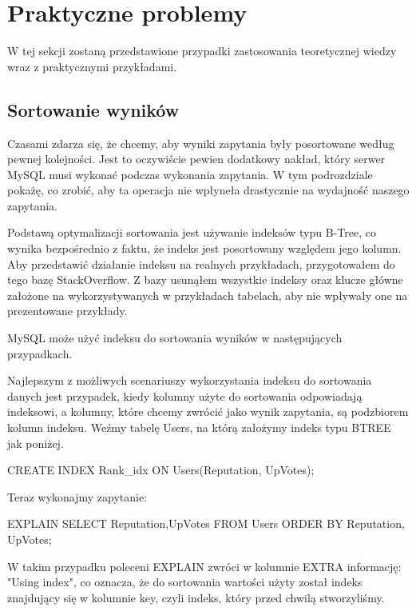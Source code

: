 \section{Praktyczne problemy}
W tej sekcji zostaną przedstawione przypadki zastosowania teoretycznej wiedzy wraz z praktycznymi przykładami.



\subsection{Sortowanie wyników}
Czasami zdarza się, że chcemy, aby wyniki zapytania były posortowane według pewnej kolejności. Jest to oczywiście pewien dodatkowy nakład, który serwer MySQL musi wykonać podczas wykonania zapytania. W tym podrozdziale pokażę, co zrobić, aby ta operacja nie wpłyneła drastycznie na wydajność naszego zapytania.

Podstawą optymalizacji sortowania jest używanie indeksów typu B-Tree, co wynika bezpośrednio z faktu, że indeks jest posortowany względem jego kolumn. Aby przedstawić działanie indeksu na realnych przykładach, przygotowałem do tego bazę StackOverflow. Z bazy usunąłem wszystkie indeksy oraz klucze główne założone na wykorzystywanych w przykładach tabelach, aby nie wpływały one na prezentowane przykłady.

MySQL może użyć indeksu do sortowania wyników w następujących przypadkach.



Najlepszym z możliwych scenariuszy wykorzystania indeksu do sortowania danych jest przypadek, kiedy kolumny użyte do sortowania odpowiadają indeksowi, a kolumny, które chcemy zwrócić jako wynik zapytania, są podzbiorem kolumn indeksu.
Weźmy tabelę Users, na którą założymy indeks typu BTREE jak poniżej.

\begin{spverbatim}
	CREATE INDEX Rank_idx ON Users(Reputation, UpVotes);
\end{spverbatim}
Teraz wykonajmy zapytanie:
\begin{spverbatim}
	EXPLAIN SELECT Reputation,UpVotes FROM Users ORDER BY Reputation, UpVotes;
\end{spverbatim}
W takim przypadku poleceni EXPLAIN zwróci w kolumnie EXTRA informację: "Using index", co oznacza, że do sortowania wartości użyty został indeks znajdujący się w kolumnie key, czyli indeks, który przed chwilą stworzyliśmy.

